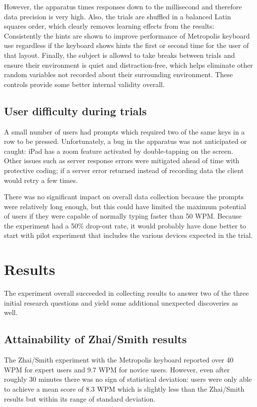 \documentclass[english]{vgtc}
\begin{document}
However, the apparatus times responses down to the millisecond and therefore data precision is very high. Also, the trials are shuffled in a balanced Latin squares order, which clearly removes learning effects from the results: Consistently the hints are shown to improve performance of Metropolis keyboard use regardless if the keyboard shows hints the first or second time for the user of that layout. Finally, the subject is allowed to take breaks between trials and ensure their environment is quiet and distraction-free, which helps eliminate other random variables not recorded about their surrounding environment. These controls provide some better internal validity overall.
\subsection{User difficulty during trials}
A small number of users had prompts which required two of the same keys in a row to be pressed. Unfortunately, a bug in the apparatus was not anticipated or caught: iPad has a zoom feature activated by double-tapping on the screen.  Other issues such as server response errors were mitigated ahead of time with protective coding; if a server error returned instead of recording data the client would retry a few times.

There was no significant impact on overall data collection because the prompts were relatively long enough, but this could have limited the maximum potential of users if they were capable of normally typing faster than 50 WPM. Because the experiment had a 50\% drop-out rate, it would probably have done better to start with pilot experiment
that includes the various devices expected in the trial.
\section{Results}

The experiment overall succeeded in collecting results to answer two of the three initial research questions and yield some additional unexpected discoveries as well.

\subsection{Attainability of Zhai/Smith results}

The Zhai/Smith experiment with the Metropolis keyboard reported over 40 WPM for expert users and 9.7 WPM for novice users. However, even after roughly 30 minutes there was no sign of statistical deviation: users were only able to achieve a mean score of 8.3 WPM which is slightly less than the Zhai/Smith results but within its range of standard deviation.  
\end{document}
